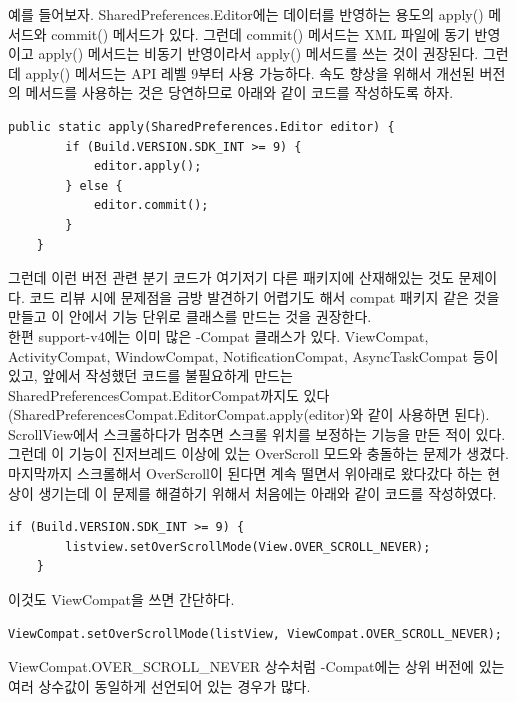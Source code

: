 예를 들어보자. SharedPreferences.Editor에는 데이터를 반영하는 용도의 apply() 메서드와 commit() 메서드가 있다. 그런데 commit() 메서드는 XML 파일에 동기 반영이고 apply() 메서드는 비동기 반영이라서 apply() 메서드를 쓰는 것이 권장된다. 그런데 apply() 메서드는 API 레벨 9부터 사용 가능하다. 속도 향상을 위해서 개선된 버전의 메서드를 사용하는 것은 당연하므로 아래와 같이 코드를 작성하도록 하자.
\begin{lstlisting}[frame=single]
	public static apply(SharedPreferences.Editor editor) {
		if (Build.VERSION.SDK_INT >= 9) {
   			editor.apply();
   		} else {
   			editor.commit();
   		}
	}
\end{lstlisting}

그런데 이런 버전 관련 분기 코드가 여기저기 다른 패키지에 산재해있는 것도 문제이다. 코드 리뷰 시에 문제점을 금방 발견하기 어렵기도 해서 compat 패키지 같은 것을 만들고 이 안에서 기능 단위로 클래스를 만드는 것을 권장한다.\\

한편 support-v4에는 이미 많은 -Compat 클래스가 있다. ViewCompat, ActivityCompat, WindowCompat, NotificationCompat, AsyncTaskCompat 등이 있고, 앞에서 작성했던 코드를 불필요하게 만드는 SharedPreferencesCompat.EditorCompat까지도 있다(SharedPreferencesCompat.EditorCompat.apply(editor)와 같이 사용하면 된다).\\

ScrollView에서 스크롤하다가 멈추면 스크롤 위치를 보정하는 기능을 만든 적이 있다. 그런데 이 기능이 진저브레드 이상에 있는 OverScroll 모드와 충돌하는 문제가 생겼다.
마지막까지 스크롤해서 OverScroll이 된다면 계속 떨면서 위아래로 왔다갔다 하는 현상이 생기는데 이 문제를 해결하기 위해서 처음에는 아래와 같이 코드를 작성하였다.
\begin{lstlisting}[frame=single]
	if (Build.VERSION.SDK_INT >= 9) {
   		listview.setOverScrollMode(View.OVER_SCROLL_NEVER);
	}
\end{lstlisting}
이것도 ViewCompat을 쓰면 간단하다.
\begin{lstlisting}[frame=single]
	ViewCompat.setOverScrollMode(listView, ViewCompat.OVER_SCROLL_NEVER);
\end{lstlisting}
ViewCompat.OVER\_SCROLL\_NEVER 상수처럼 -Compat에는 상위 버전에 있는 여러 상수값이 동일하게 선언되어 있는 경우가 많다.\\

